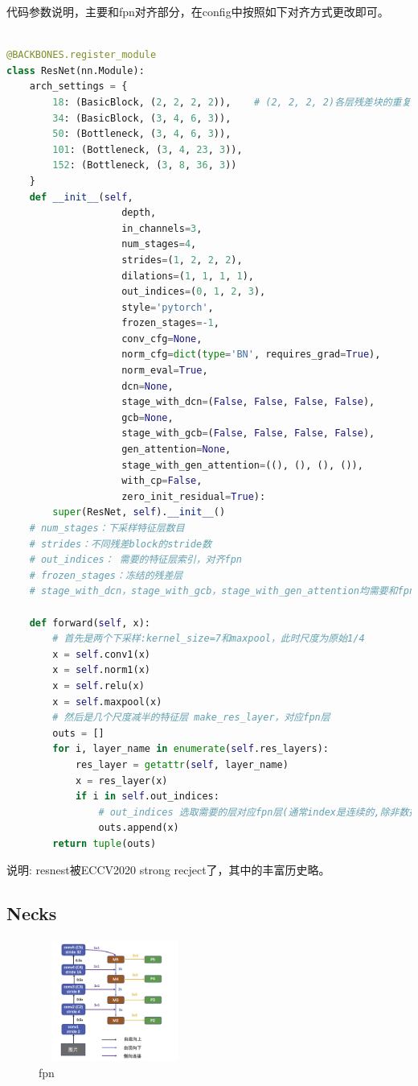 \documentclass[UTF8]{ctexart}
\begin{document}
代码参数说明，主要和fpn对齐部分，在config中按照如下对齐方式更改即可。
\lstset{style=mystyle}
\begin{lstlisting}[language=Python]

@BACKBONES.register_module
class ResNet(nn.Module):
	arch_settings = {
		18: (BasicBlock, (2, 2, 2, 2)),    # (2, 2, 2, 2)各层残差块的重复数目
		34: (BasicBlock, (3, 4, 6, 3)),
		50: (Bottleneck, (3, 4, 6, 3)),
		101: (Bottleneck, (3, 4, 23, 3)),
		152: (Bottleneck, (3, 8, 36, 3))
	}
	def __init__(self,
					depth,
					in_channels=3,
					num_stages=4,
					strides=(1, 2, 2, 2),
					dilations=(1, 1, 1, 1),
					out_indices=(0, 1, 2, 3),
					style='pytorch',
					frozen_stages=-1,
					conv_cfg=None,
					norm_cfg=dict(type='BN', requires_grad=True),
					norm_eval=True,
					dcn=None,
					stage_with_dcn=(False, False, False, False),
					gcb=None,
					stage_with_gcb=(False, False, False, False),
					gen_attention=None,
					stage_with_gen_attention=((), (), (), ()),
					with_cp=False,
					zero_init_residual=True):
		super(ResNet, self).__init__()
	# num_stages：下采样特征层数目
	# strides：不同残差block的stride数
	# out_indices： 需要的特征层索引，对齐fpn
	# frozen_stages：冻结的残差层
	# stage_with_dcn，stage_with_gcb，stage_with_gen_attention均需要和fpn层对齐

	def forward(self, x):
		# 首先是两个下采样:kernel_size=7和maxpool，此时尺度为原始1/4
		x = self.conv1(x)
		x = self.norm1(x)
		x = self.relu(x)
		x = self.maxpool(x)
		# 然后是几个尺度减半的特征层 make_res_layer，对应fpn层
		outs = []
		for i, layer_name in enumerate(self.res_layers):
			res_layer = getattr(self, layer_name)
			x = res_layer(x)
			if i in self.out_indices:
				# out_indices 选取需要的层对应fpn层(通常index是连续的,除非数据特殊，刚好都只有一大一小物体)
				outs.append(x)
		return tuple(outs)
\end{lstlisting}

说明: resnest被ECCV2020 strong recject了，其中的丰富历史略。

\subsection{Necks}

\begin{figure}[htbp]
	\centering
	\includegraphics[width=5cm,height=4cm]{./pic/fpn.png}
	\caption{fpn}
	\label{picfpn}
\end{figure}
\end{document}
